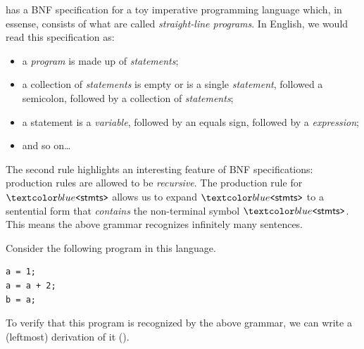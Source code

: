  has a BNF specification for a toy imperative programming language which, in essense, consists of what are called \textit{straight-line programs}.
In English, we would read this specification as:
\begin{itemize}
\item a \textit{program} is made up of \textit{statements};
\item a collection of \textit{statements} is empty or is a single \textit{statement}, followed a semicolon, followed by a collection of \textit{statements};
\item a statement is a \textit{variable}, followed by an equals sign, followed by a \textit{expression};
\item and so on\dots
\end{itemize}
%
The second rule highlights an interesting feature of BNF specifications: production rules are allowed to be \textit{recursive}.
The production rule for $\bnfnt{stmts}$ allows us to expand $\bnfnt{stmts}$ to a sentential form that \textit{contains} the non-terminal symbol $\bnfnt{stmts}$.
This means the above grammar recognizes infinitely many sentences.

Consider the following program in this language.

\begin{lstlisting}
a = 1;
a = a + 2;
b = a;
\end{lstlisting}
%
To verify that this program is recognized by the above grammar, we can write a (leftmost) derivation of it ().

